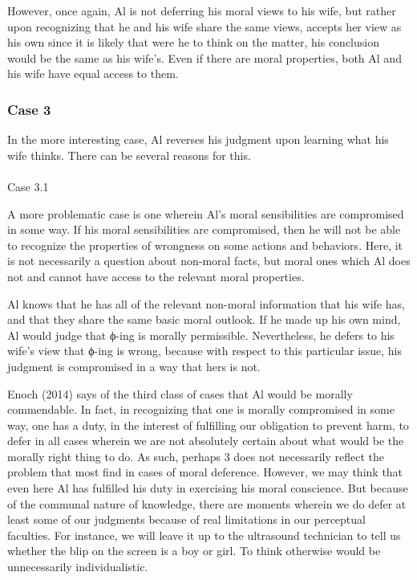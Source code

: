\documentclass[
  letterpaper,
  DIV=11,
  numbers=noendperiod]{scrartcl}
\makeatletter
\let\oldparagraph\paragraph
\renewcommand{\paragraph}{
    \@ifstar
      \xxxParagraphStar
      \xxxParagraphNoStar
  }
\newcommand{\xxxParagraphStar}[1]{\oldparagraph*{#1}\mbox{}}
\newcommand{\xxxParagraphNoStar}[1]{\oldparagraph{#1}\mbox{}}
\theoremstyle{remark}
\makeatother
\begin{document}
However, once again, Al is not deferring his moral views to his wife,
but rather upon recognizing that he and his wife share the same views,
accepts her view as his own since it is likely that were he to think on
the matter, his conclusion would be the same as his wife's. Even if
there are moral properties, both Al and his wife have equal access to
them.

\subsubsection{Case 3}\label{case-3}

In the more interesting case, Al reverses his judgment upon learning
what his wife thinks. There can be several reasons for this.

\paragraph{Case 3.1}\label{case-3.1}

A more problematic case is one wherein Al's moral sensibilities are
compromised in some way. If his moral sensibilities are compromised,
then he will not be able to recognize the properties of wrongness on
some actions and behaviors. Here, it is not necessarily a question about
non-moral facts, but moral ones which Al does not and cannot have access
to the relevant moral properties.

Al knows that he has all of the relevant non-moral information that his
wife has, and that they share the same basic moral outlook. If he made
up his own mind, Al would judge that ϕ-ing is morally permissible.
Nevertheless, he defers to his wife's view that ϕ-ing is wrong, because
with respect to this particular issue, his judgment is compromised in a
way that hers is not.

Enoch (2014) says of the third class of cases that Al would be morally
commendable. In fact, in recognizing that one is morally compromised in
some way, one has a duty, in the interest of fulfilling our obligation
to prevent harm, to defer in all cases wherein we are not absolutely
certain about what would be the morally right thing to do. As such,
perhaps 3 does not necessarily reflect the problem that most find in
cases of moral deference. However, we may think that even here Al has
fulfilled his duty in exercising his moral conscience. But because of
the communal nature of knowledge, there are moments wherein we do defer
at least some of our judgments because of real limitations in our
perceptual faculties. For instance, we will leave it up to the
ultrasound technician to tell us whether the blip on the screen is a boy
or girl. To think otherwise would be unnecessarily individualistic.
\end{document}
